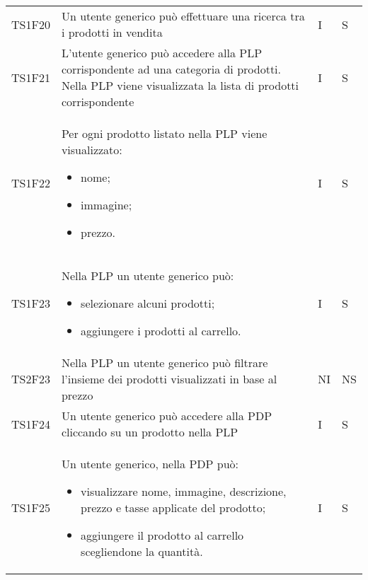 {\begin{longtable}{C{2cm} C{9.6cm} C{1.5cm} C{1cm}}
TS1F20 & Un utente generico può effettuare una ricerca tra i prodotti in vendita & I & S\\

TS1F21 & L'utente generico può accedere alla PLP corrispondente ad una categoria di prodotti. Nella PLP viene visualizzata la lista di prodotti corrispondente & I & S\\

TS1F22 & Per ogni prodotto listato nella PLP viene visualizzato:
\begin{itemize}
	\item nome;
	\item immagine;
	\item prezzo.
\end{itemize} & I & S\\

TS1F23 & Nella PLP un utente generico può:
\begin{itemize}
	\item selezionare alcuni prodotti;
	\item aggiungere i prodotti al carrello.
\end{itemize} & I & S\\

TS2F23 & Nella PLP un utente generico può filtrare l'insieme dei prodotti visualizzati in base al prezzo & NI & NS\\

TS1F24 & Un utente generico può accedere alla PDP cliccando su un prodotto nella PLP & I & S\\

TS1F25 & Un utente generico, nella PDP può:
\begin{itemize}
	\item visualizzare nome, immagine, descrizione, prezzo e tasse applicate del prodotto;
	\item aggiungere il prodotto al carrello scegliendone la quantità.
\end{itemize} & I & S\\



\end{longtable}


}
